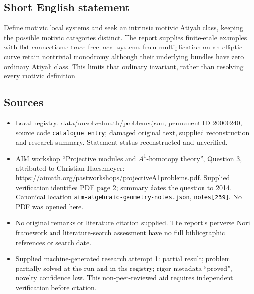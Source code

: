 \documentclass[11pt]{article}
\begin{document}
\subsection{Short English statement}
Define motivic local systems and seek an intrinsic motivic Atiyah class, keeping the possible motivic categories distinct. The report supplies finite-etale examples with flat connections: trace-free local systems from multiplication on an elliptic curve retain nontrivial monodromy although their underlying bundles have zero ordinary Atiyah class. This limits that ordinary invariant, rather than resolving every motivic definition.
\subsection{Sources}
\begin{itemize}
\item Local registry: \url{data/unsolvedmath/problems.json}, permanent ID $20000240$, source code \texttt{catalogue entry}; damaged original text, supplied reconstruction and research summary. Statement status reconstructed and unverified.
\item AIM workshop ``Projective modules and $A^1$-homotopy theory'', Question 3, attributed to Christian Haesemeyer: \url{https://aimath.org/pastworkshops/projectiveA1problems.pdf}. Supplied verification identifies PDF page 2; summary dates the question to 2014. Canonical location \texttt{aim-algebraic-geometry-notes.json}, \texttt{notes[239]}. No PDF was opened here.
\item No original remarks or literature citation supplied. The report's perverse Nori framework and literature-search assessment have no full bibliographic references or search date.
\item Supplied machine-generated research attempt 1: partial result; problem partially solved at the run and in the registry; rigor metadata ``proved'', novelty confidence low. This non-peer-reviewed aid requires independent verification before citation.
\end{itemize}
\end{document}
